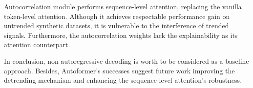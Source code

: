 \documentclass[12pt]{article}
\begin{document}
Autocorrelation module performs sequence-level attention, replacing the vanilla token-level attention. 
Although it achieves respectable performance gain on untrended synthetic datasets, it is vulnerable to the interference of trended signals. 
Furthermore, the autocorrelation weights lack the explainability as its attention counterpart. 

In conclusion, non-autoregressive decoding is worth to be considered as a baseline approach. 
Besides, Autoformer's successes suggest future work improving the detrending mechanism and enhancing the sequence-level attention's robustness. 


\newpage




\newpage

\end{document}
